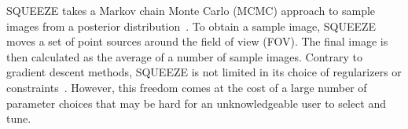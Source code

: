 {%


SQUEEZE takes a Markov chain Monte Carlo (MCMC) approach to sample images from a posterior distribution~\cite{baron2010novel}. To obtain a sample image, SQUEEZE moves a set of point sources around the field of view (FOV). The final image is then calculated as the average of a number of sample images. 
Contrary to gradient descent methods, SQUEEZE is not limited in its choice of regularizers or constraints~\cite{rusenimaging}. 
However, this freedom comes at the cost of a large number of parameter choices that may be hard for an unknowledgeable user to select and tune. 


}
